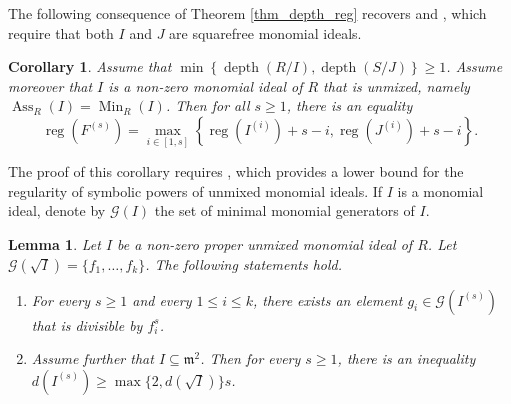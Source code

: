 \documentclass{amsart}
\DeclareMathOperator{\Ass}{Ass}
\DeclareMathOperator{\depth}{depth}
\DeclareMathOperator{\Min}{Min}
\DeclareMathOperator{\reg}{reg}
\newcommand{\Gcc}{\mathcal{G}}
\newcommand{\mm}{\mathfrak{m}}
\theoremstyle{plain}
\newtheorem{lem}[thm]{Lemma}
\newtheorem{cor}[thm]{Corollary}
\theoremstyle{definition}
\numberwithin{equation}{section}
\begin{document}
The following consequence of Theorem \ref{thm_depth_reg} recovers \cite[Theorem 3.2]{KKS} and \cite[Corollary 4.12]{OR19}, which require that both $I$ and $J$ are squarefree monomial ideals.
\begin{cor}
\label{cor_reg_Fs_unmixedcase}
Assume that $\min\left\{\depth(R/I),\depth(S/J)\right \}\ge 1$. Assume moreover that $I$ is a non-zero monomial ideal of $R$ that is unmixed, namely $\Ass_R(I)=\Min_R(I)$. Then for all $s\ge 1$, there is an equality
$$
\reg (F^{(s)})=\max \limits_{i\in [1,s]} \left\{\reg(I^{(i)})+s-i, \reg(J^{(i)})+s-i \right\}.
$$
\end{cor}
The proof of this corollary requires , which provides a lower bound for the regularity of symbolic powers of unmixed monomial ideals.   If $I$ is a monomial ideal, denote by $\Gcc(I)$ the set of minimal monomial generators of $I$.
\begin{lem}
\label{lem_maxdegree_symbolicpowers}
Let $I$ be a non-zero proper unmixed monomial ideal of $R$. Let $\Gcc(\sqrt{I})=\{f_1,\ldots,f_k\}$. The following statements hold.
\begin{enumerate}[\quad \rm(i)]
 \item For every $s\ge 1$ and every $1\le i\le k$, there exists an element $g_i\in \Gcc(I^{(s)})$ that is divisible by $f_i^s$.
 \item  Assume further that $I\subseteq \mm^2$. Then for every $s\ge 1$, there is an inequality $d(I^{(s)}) \ge \max\{2,d(\sqrt{I})\}s$.
\end{enumerate}
\end{lem}
\end{document}

